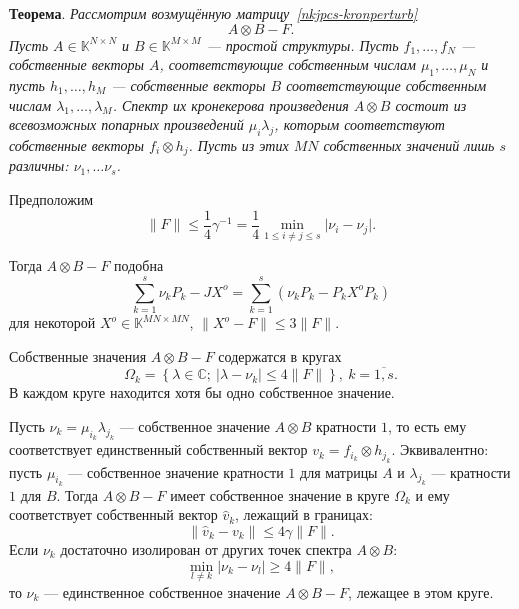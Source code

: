 \documentclass[12pt]{article}
\begin{document}
\begingroup
\textbf{Теорема}.
\itshape
    Рассмотрим возмущённую матрицу~\eqref{nkjpcs-kronperturb}
        \[
            A{\otimes}B - F.
        \]
    Пусть \( A\in\mathbb{K}^{N{\times}N} \) и \( B\in\mathbb{K}^{M{\times}M} \)
        --- простой структуры.
    Пусть \( f_1, \ldots, f_N \) --- собственные векторы \( A \),
        соответствующие собственным числам \( \mu_1, \ldots, \mu_N \)
        и пусть \( h_1, \ldots, h_M \) --- собственные векторы \( B \)
        соответствующие собственным числам \( \lambda_1, \ldots, \lambda_M \).
    Спектр их кронекерова произведения \( A{\otimes}B \)
        состоит из всевозможных попарных произведений \( \mu_i \lambda_j \),
        которым соответствуют собственные векторы \( f_i\otimes h_j \).
    Пусть из этих \( MN \) собственных значений лишь \( s \) различны:
        \( \nu_1, \ldots \nu_s \).

    Предположим
    \[
        \|F\| \leq \frac14 \gamma^{-1} = \frac14 \min_{1\leq i{\neq}j\leq s}\lvert\nu_i - \nu_j\rvert.
    \]

    Тогда \( A{\otimes}B - F \) подобна
    \[ \sum_{k=1}^s \nu_k P_k - JX^o = \sum_{k=1}^s (\nu_k P_k - P_k X^o P_k) \]
    для некоторой \( X^o \in \mathbb{K}^{MN{\times}MN} \),
    \( \|X^o - F\|\leq 3\|F\| \).

    Собственные значения \( A{\otimes}B - F \) содержатся в кругах
    \[
        \Omega_k = \left\{
            \lambda\in\mathbb{C};
            \ \lvert\lambda - \nu_k\rvert \leq 4\|F\|
            \right\},
        \ k{=}\overline{1,s}.
    \]
    В каждом круге находится хотя бы одно собственное значение.

    Пусть \( \nu_k=\mu_{i_k}\lambda_{j_k} \) --- собственное значение \( A{\otimes}B \) кратности \( 1 \),
        то есть ему соответствует единственный собственный вектор \( v_k = f_{i_k}{\otimes}h_{j_k} \).
    Эквивалентно: пусть \( \mu_{i_k} \) --- собственное значение кратности \( 1 \) для матрицы \( A \)
    и \( \lambda_{j_k} \) --- кратности \( 1\) для \( B \).
    Тогда \( A{\otimes}B - F \) имеет собственное значение в круге \( \Omega_k \)
        и ему соответствует собственный вектор \( \hat{v}_k \), лежащий в границах:
    \[
        \|\hat{v}_k - v_k\| \leq 4\gamma \|F\|.
    \]
    Если \( \nu_k \) достаточно изолирован от других точек спектра \( A{\otimes}B \):
    \[
        \min_{l\neq k}
        \lvert
        \nu_k - \nu_l
        \rvert
        \geq 4\|F\|,
    \]
    то \( \nu_k \) --- единственное собственное значение \( A{\otimes}B - F \),
    лежащее в этом круге.
\endgroup
\end{document}
